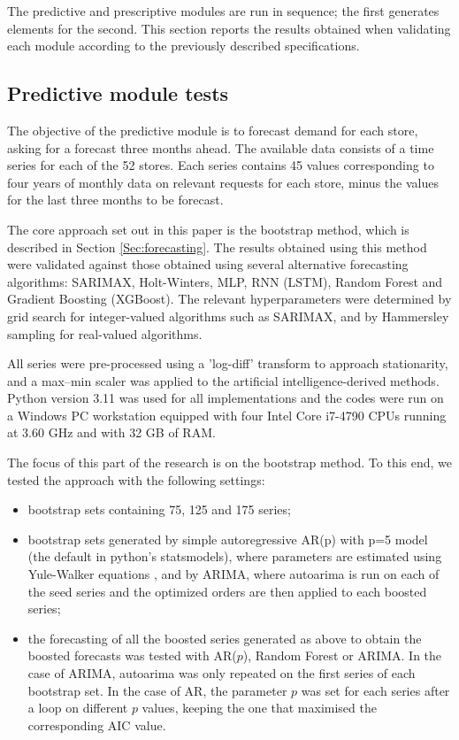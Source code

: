 \documentclass[ijoc,sglanonrev]{informs4}
\begin{document}
The predictive and prescriptive modules are run in sequence; the first generates elements for the second. This section reports the results obtained when validating each module according to the previously described specifications.

\subsection{Predictive module tests} \label{Subsec:predictive}

The objective of the predictive module is to forecast demand for each store, asking for a forecast three months ahead.
The available data consists of a time series for each of the 52 stores. Each series contains 45 values corresponding to four years of monthly data on relevant requests for each store, minus the values for the last three months to be forecast.

The core approach set out in this paper is the bootstrap method, which is described in Section \ref{Sec:forecasting}. The results obtained using this method were validated against those obtained using several alternative forecasting algorithms: SARIMAX, Holt-Winters, MLP, RNN (LSTM), Random Forest and Gradient Boosting (XGBoost). The relevant hyperparameters were determined by grid search for integer-valued algorithms such as SARIMAX, and by Hammersley sampling \citep{H60} for real-valued algorithms.

All series were pre-processed using a 'log-diff' transform to approach stationarity, and a max–min scaler was applied to the artificial intelligence-derived methods. Python version 3.11 was used for all implementations and the codes were run on a Windows PC workstation equipped with four Intel Core i7-4790 CPUs running at 3.60 GHz and with 32 GB of RAM.

The focus of this part of the research is on the bootstrap method. To this end, we tested the approach with the following settings:
\begin{itemize}
\item bootstrap sets containing 75, 125 and 175 series;
\item bootstrap sets generated by simple autoregressive AR(p) with p=5 model (the default in python's statsmodels), where parameters are estimated using Yule-Walker equations \citep{BD91}, and by ARIMA, where autoarima is run on each of the seed series and the optimized orders are then applied to each boosted series;
\item the forecasting of all the boosted series generated as above to obtain the boosted forecasts was tested with AR($p$), Random Forest or ARIMA. In the case of ARIMA, autoarima was only repeated on the first series of each bootstrap set. In the case of AR, the parameter $p$ was set for each series after a loop on different $p$ values, keeping the one that maximised the corresponding AIC value.
\end{itemize}
\end{document}
